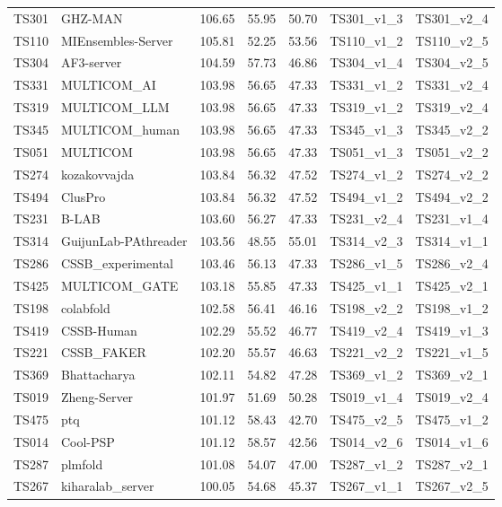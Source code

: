 \begin{table}[ht]
{\begin{tabular}{llrrrll}
TS301 & GHZ-MAN & 106.65 & 55.95 & 50.70 & TS301\_v1\_3 & TS301\_v2\_4 \\ 
TS110 & MIEnsembles-Server & 105.81 & 52.25 & 53.56 & TS110\_v1\_2 & TS110\_v2\_5 \\ 
TS304 & AF3-server & 104.59 & 57.73 & 46.86 & TS304\_v1\_4 & TS304\_v2\_5 \\ 
TS331 & MULTICOM\_AI & 103.98 & 56.65 & 47.33 & TS331\_v1\_2 & TS331\_v2\_4 \\ 
TS319 & MULTICOM\_LLM & 103.98 & 56.65 & 47.33 & TS319\_v1\_2 & TS319\_v2\_4 \\ 
TS345 & MULTICOM\_human & 103.98 & 56.65 & 47.33 & TS345\_v1\_3 & TS345\_v2\_2 \\ 
TS051 & MULTICOM & 103.98 & 56.65 & 47.33 & TS051\_v1\_3 & TS051\_v2\_2 \\ 
TS274 & kozakovvajda & 103.84 & 56.32 & 47.52 & TS274\_v1\_2 & TS274\_v2\_2 \\ 
TS494 & ClusPro & 103.84 & 56.32 & 47.52 & TS494\_v1\_2 & TS494\_v2\_2 \\ 
TS231 & B-LAB & 103.60 & 56.27 & 47.33 & TS231\_v2\_4 & TS231\_v1\_4 \\ 
TS314 & GuijunLab-PAthreader & 103.56 & 48.55 & 55.01 & TS314\_v2\_3 & TS314\_v1\_1 \\ 
TS286 & CSSB\_experimental & 103.46 & 56.13 & 47.33 & TS286\_v1\_5 & TS286\_v2\_4 \\ 
TS425 & MULTICOM\_GATE & 103.18 & 55.85 & 47.33 & TS425\_v1\_1 & TS425\_v2\_1 \\ 
TS198 & colabfold & 102.58 & 56.41 & 46.16 & TS198\_v2\_2 & TS198\_v1\_2 \\ 
TS419 & CSSB-Human & 102.29 & 55.52 & 46.77 & TS419\_v2\_4 & TS419\_v1\_3 \\ 
TS221 & CSSB\_FAKER & 102.20 & 55.57 & 46.63 & TS221\_v2\_2 & TS221\_v1\_5 \\ 
TS369 & Bhattacharya & 102.11 & 54.82 & 47.28 & TS369\_v1\_2 & TS369\_v2\_1 \\ 
TS019 & Zheng-Server & 101.97 & 51.69 & 50.28 & TS019\_v1\_4 & TS019\_v2\_4 \\ 
TS475 & ptq & 101.12 & 58.43 & 42.70 & TS475\_v2\_5 & TS475\_v1\_2 \\ 
TS014 & Cool-PSP & 101.12 & 58.57 & 42.56 & TS014\_v2\_6 & TS014\_v1\_6 \\ 
TS287 & plmfold & 101.08 & 54.07 & 47.00 & TS287\_v1\_2 & TS287\_v2\_1 \\ 
TS267 & kiharalab\_server & 100.05 & 54.68 & 45.37 & TS267\_v1\_1 & TS267\_v2\_5 \\ 

\end{tabular}}
\end{table}
